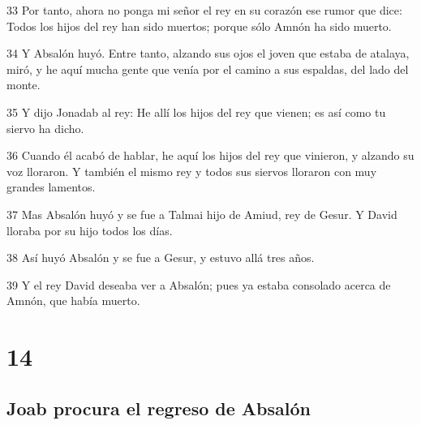 \par 33 Por tanto, ahora no ponga mi señor el rey en su corazón ese rumor que dice: Todos los hijos del rey han sido muertos; porque sólo Amnón ha sido muerto.
\par 34 Y Absalón huyó. Entre tanto, alzando sus ojos el joven que estaba de atalaya, miró, y he aquí mucha gente que venía por el camino a sus espaldas, del lado del monte.
\par 35 Y dijo Jonadab al rey: He allí los hijos del rey que vienen; es así como tu siervo ha dicho.
\par 36 Cuando él acabó de hablar, he aquí los hijos del rey que vinieron, y alzando su voz lloraron. Y también el mismo rey y todos sus siervos lloraron con muy grandes lamentos.
\par 37 Mas Absalón huyó y se fue a Talmai hijo de Amiud, rey de Gesur. Y David lloraba por su hijo todos los días.
\par 38 Así huyó Absalón y se fue a Gesur, y estuvo allá tres años.
\par 39 Y el rey David deseaba ver a Absalón; pues ya estaba consolado acerca de Amnón, que había muerto.

\chapter{14}

\section*{Joab procura el regreso de Absalón}

